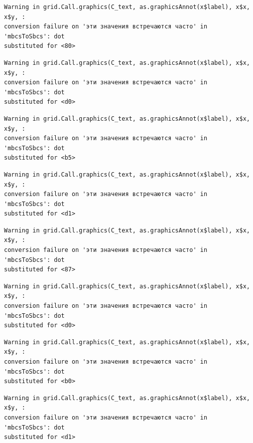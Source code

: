 \documentclass[
  letterpaper,
]{scrbook}
\theoremstyle{definition}
\theoremstyle{remark}
\begin{document}
\begin{verbatim}
Warning in grid.Call.graphics(C_text, as.graphicsAnnot(x$label), x$x, x$y, :
conversion failure on 'эти значения встречаются часто' in 'mbcsToSbcs': dot
substituted for <80>
\end{verbatim}

\begin{verbatim}
Warning in grid.Call.graphics(C_text, as.graphicsAnnot(x$label), x$x, x$y, :
conversion failure on 'эти значения встречаются часто' in 'mbcsToSbcs': dot
substituted for <d0>
\end{verbatim}

\begin{verbatim}
Warning in grid.Call.graphics(C_text, as.graphicsAnnot(x$label), x$x, x$y, :
conversion failure on 'эти значения встречаются часто' in 'mbcsToSbcs': dot
substituted for <b5>
\end{verbatim}

\begin{verbatim}
Warning in grid.Call.graphics(C_text, as.graphicsAnnot(x$label), x$x, x$y, :
conversion failure on 'эти значения встречаются часто' in 'mbcsToSbcs': dot
substituted for <d1>
\end{verbatim}

\begin{verbatim}
Warning in grid.Call.graphics(C_text, as.graphicsAnnot(x$label), x$x, x$y, :
conversion failure on 'эти значения встречаются часто' in 'mbcsToSbcs': dot
substituted for <87>
\end{verbatim}

\begin{verbatim}
Warning in grid.Call.graphics(C_text, as.graphicsAnnot(x$label), x$x, x$y, :
conversion failure on 'эти значения встречаются часто' in 'mbcsToSbcs': dot
substituted for <d0>
\end{verbatim}

\begin{verbatim}
Warning in grid.Call.graphics(C_text, as.graphicsAnnot(x$label), x$x, x$y, :
conversion failure on 'эти значения встречаются часто' in 'mbcsToSbcs': dot
substituted for <b0>
\end{verbatim}

\begin{verbatim}
Warning in grid.Call.graphics(C_text, as.graphicsAnnot(x$label), x$x, x$y, :
conversion failure on 'эти значения встречаются часто' in 'mbcsToSbcs': dot
substituted for <d1>
\end{verbatim}
\end{document}
